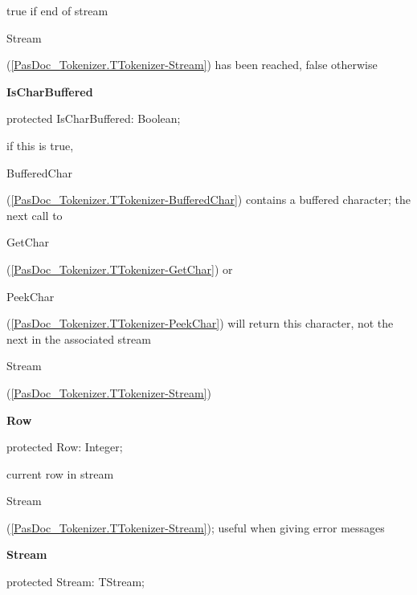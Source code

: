 \documentclass{report}
\newif\ifpdf
\begin{document}
\begin{list}{}
\begin{flushleft}
\ifpdf
\end{flushleft}
\fi


\par true if end of stream \begin{ttfamily}Stream\end{ttfamily}(\ref{PasDoc_Tokenizer.TTokenizer-Stream}) has been reached, false otherwise\label{PasDoc_Tokenizer.TTokenizer-IsCharBuffered}
\item[\textbf{IsCharBuffered}\hfill]
\ifpdf
\begin{flushleft}
\fi
\begin{ttfamily}
protected IsCharBuffered: Boolean;\end{ttfamily}

\ifpdf
\end{flushleft}
\fi


\par if this is true, \begin{ttfamily}BufferedChar\end{ttfamily}(\ref{PasDoc_Tokenizer.TTokenizer-BufferedChar}) contains a buffered character; the next call to \begin{ttfamily}GetChar\end{ttfamily}(\ref{PasDoc_Tokenizer.TTokenizer-GetChar}) or \begin{ttfamily}PeekChar\end{ttfamily}(\ref{PasDoc_Tokenizer.TTokenizer-PeekChar}) will return this character, not the next in the associated stream \begin{ttfamily}Stream\end{ttfamily}(\ref{PasDoc_Tokenizer.TTokenizer-Stream})\label{PasDoc_Tokenizer.TTokenizer-Row}
\item[\textbf{Row}\hfill]
\ifpdf
\begin{flushleft}
\fi
\begin{ttfamily}
protected Row: Integer;\end{ttfamily}

\ifpdf
\end{flushleft}
\fi


\par current row in stream \begin{ttfamily}Stream\end{ttfamily}(\ref{PasDoc_Tokenizer.TTokenizer-Stream}); useful when giving error messages\label{PasDoc_Tokenizer.TTokenizer-Stream}
\item[\textbf{Stream}\hfill]
\ifpdf
\begin{flushleft}
\fi
\begin{ttfamily}
protected Stream: TStream;\end{ttfamily}


\end{flushleft}
\end{list}
\end{document}
